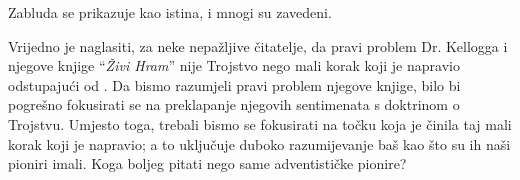 Zabluda se prikazuje kao istina, i mnogi su zavedeni.

Vrijedno je naglasiti, za neke nepažljive čitatelje, da pravi problem Dr. Kellogga i njegove knjige “\textit{Živi Hram}” nije Trojstvo nego mali korak koji je napravio odstupajući od . Da bismo razumjeli pravi problem njegove knjige, bilo bi pogrešno fokusirati se na preklapanje njegovih sentimenata s doktrinom o Trojstvu. Umjesto toga, trebali bismo se fokusirati na točku koja je činila taj mali korak koji je napravio; a to uključuje duboko razumijevanje  baš kao što su ih naši pioniri imali. Koga boljeg pitati nego same adventističke pionire?
